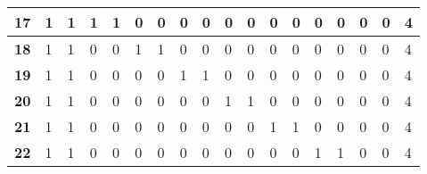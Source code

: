\begin{center}
\begin{longtable}{|P{0.3cm}|P{0.3cm}|P{0.3cm}|P{0.3cm}|P{0.3cm}|P{0.3cm}|P{0.3cm}|P{0.3cm}|P{0.3cm}|P{0.3cm}|P{0.3cm}|P{0.3cm}|P{0.3cm}|P{0.3cm}|P{0.3cm}|P{0.3cm}|P{0.3cm}|P{1.4cm}|}
\textbf{17}                        & 1                     & 1                     & 1                     & 1                     & 0                     & 0                     & 0                     & 0                     & 0                     & 0                     & 0                     & 0                     & 0                     & 0                     & 0                     & 0                     & 4                     \\ \hline
\textbf{18}                        & 1                     & 1                     & 0                     & 0                     & 1                     & 1                     & 0                     & 0                     & 0                     & 0                     & 0                     & 0                     & 0                     & 0                     & 0                     & 0                     & 4                     \\ \hline
\textbf{19}                        & 1                     & 1                     & 0                     & 0                     & 0                     & 0                     & 1                     & 1                     & 0                     & 0                     & 0                     & 0                     & 0                     & 0                     & 0                     & 0                     & 4                     \\ \hline
\textbf{20}                        & 1                     & 1                     & 0                     & 0                     & 0                     & 0                     & 0                     & 0                     & 1                     & 1                     & 0                     & 0                     & 0                     & 0                     & 0                     & 0                     & 4                     \\ \hline
\textbf{21}                        & 1                     & 1                     & 0                     & 0                     & 0                     & 0                     & 0                     & 0                     & 0                     & 0                     & 1                     & 1                     & 0                     & 0                     & 0                     & 0                     & 4                     \\ \hline
\textbf{22}                        & 1                     & 1                     & 0                     & 0                     & 0                     & 0                     & 0                     & 0                     & 0                     & 0                     & 0                     & 0                     & 1                     & 1                     & 0                     & 0                     & 4                     \\ \hline

\end{longtable}
\end{center}
